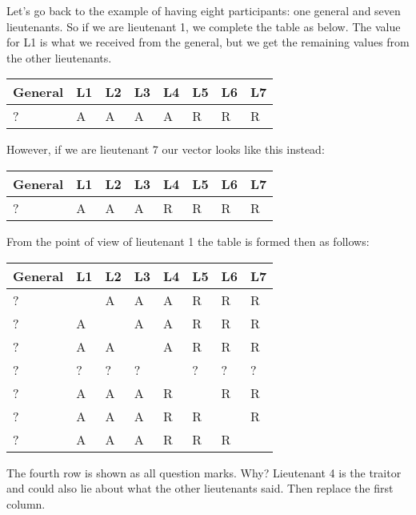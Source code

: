Let's go back to the example of having eight participants: one general and seven lieutenants. So if we are lieutenant 1, we complete the table as below. The value for L1 is what we received from the general, but we get the remaining values from the other lieutenants.

\begin{center}
	\begin{tabular}{|l|l|l|l|l|l|l|l|}
		\hline
		General & L1 & L2 & L3 & L4 & L5 & L6 & L7 \\
		\hline
		?       & A  & A  & A  & A  & R  & R  & R  \\
		\hline
	\end{tabular}
\end{center}

However, if we are lieutenant 7 our vector looks like this instead:

\begin{center}
	\begin{tabular}{|l|l|l|l|l|l|l|l|}
		\hline
		General & L1 & L2 & L3 & L4 & L5 & L6 & L7 \\
		\hline
		?       & A  & A  & A  & R  & R  & R  & R  \\
		\hline
	\end{tabular}
\end{center}

From the point of view of lieutenant 1 the table is formed then as follows:

\begin{center}
	\begin{tabular}{|l|l|l|l|l|l|l|l|}
		\hline
		General & L1 & L2 & L3 & L4 & L5 & L6 & L7 \\
		\hline
		?       & ~  & A  & A  & A  & R  & R  & R  \\ \hline
		?       & A  & ~  & A  & A  & R  & R  & R  \\ \hline
		?       & A  & A  & ~  & A  & R  & R  & R  \\ \hline
		?       & ?  & ?  & ?  & ~  & ?  & ?  & ?  \\ \hline
		?       & A  & A  & A  & R  & ~  & R  & R  \\ \hline
		?       & A  & A  & A  & R  & R  & ~  & R  \\ \hline
		?       & A  & A  & A  & R  & R  & R  & ~  \\ \hline
	\end{tabular}
\end{center}

The fourth row is shown as all question marks. Why? Lieutenant 4 is the traitor and could also lie about what the other lieutenants said. Then replace the first column.

